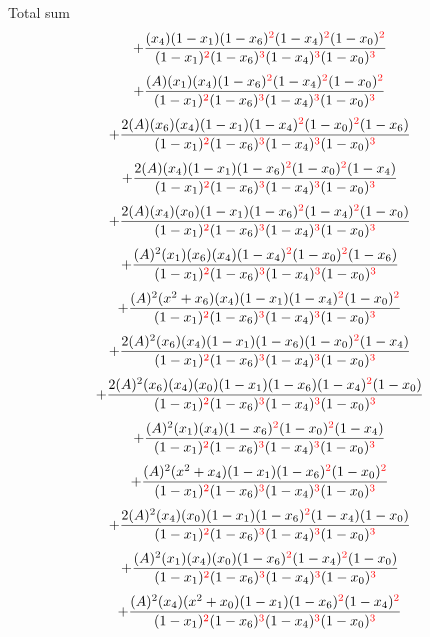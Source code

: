 \documentclass{article}
\begin{document}
Total sum
\[+\frac{(x_4)(1-x_1)(1-x_6)^{\textcolor{red}{2}}(1-x_4)^{\textcolor{red}{2}}(1-x_0)^{\textcolor{red}{2}}}{(1-x_1)^{\textcolor{red}{2}}(1-x_6)^{\textcolor{red}{3}}(1-x_4)^{\textcolor{red}{3}}(1-x_0)^{\textcolor{red}{3}}}\]\[+\frac{(A)(x_1)(x_4)(1-x_6)^{\textcolor{red}{2}}(1-x_4)^{\textcolor{red}{2}}(1-x_0)^{\textcolor{red}{2}}}{(1-x_1)^{\textcolor{red}{2}}(1-x_6)^{\textcolor{red}{3}}(1-x_4)^{\textcolor{red}{3}}(1-x_0)^{\textcolor{red}{3}}}\]\[+\frac{2(A)(x_6)(x_4)(1-x_1)(1-x_4)^{\textcolor{red}{2}}(1-x_0)^{\textcolor{red}{2}}(1-x_6)}{(1-x_1)^{\textcolor{red}{2}}(1-x_6)^{\textcolor{red}{3}}(1-x_4)^{\textcolor{red}{3}}(1-x_0)^{\textcolor{red}{3}}}\]\[+\frac{2(A)(x_4)(1-x_1)(1-x_6)^{\textcolor{red}{2}}(1-x_0)^{\textcolor{red}{2}}(1-x_4)}{(1-x_1)^{\textcolor{red}{2}}(1-x_6)^{\textcolor{red}{3}}(1-x_4)^{\textcolor{red}{3}}(1-x_0)^{\textcolor{red}{3}}}\]\[+\frac{2(A)(x_4)(x_0)(1-x_1)(1-x_6)^{\textcolor{red}{2}}(1-x_4)^{\textcolor{red}{2}}(1-x_0)}{(1-x_1)^{\textcolor{red}{2}}(1-x_6)^{\textcolor{red}{3}}(1-x_4)^{\textcolor{red}{3}}(1-x_0)^{\textcolor{red}{3}}}\]\[+\frac{(A)^{2}(x_1)(x_6)(x_4)(1-x_4)^{\textcolor{red}{2}}(1-x_0)^{\textcolor{red}{2}}(1-x_6)}{(1-x_1)^{\textcolor{red}{2}}(1-x_6)^{\textcolor{red}{3}}(1-x_4)^{\textcolor{red}{3}}(1-x_0)^{\textcolor{red}{3}}}\]\[+\frac{(A)^{2}(x^{2}+x_6)(x_4)(1-x_1)(1-x_4)^{\textcolor{red}{2}}(1-x_0)^{\textcolor{red}{2}}}{(1-x_1)^{\textcolor{red}{2}}(1-x_6)^{\textcolor{red}{3}}(1-x_4)^{\textcolor{red}{3}}(1-x_0)^{\textcolor{red}{3}}}\]\[+\frac{2(A)^{2}(x_6)(x_4)(1-x_1)(1-x_6)(1-x_0)^{\textcolor{red}{2}}(1-x_4)}{(1-x_1)^{\textcolor{red}{2}}(1-x_6)^{\textcolor{red}{3}}(1-x_4)^{\textcolor{red}{3}}(1-x_0)^{\textcolor{red}{3}}}\]\[+\frac{2(A)^{2}(x_6)(x_4)(x_0)(1-x_1)(1-x_6)(1-x_4)^{\textcolor{red}{2}}(1-x_0)}{(1-x_1)^{\textcolor{red}{2}}(1-x_6)^{\textcolor{red}{3}}(1-x_4)^{\textcolor{red}{3}}(1-x_0)^{\textcolor{red}{3}}}\]\[+\frac{(A)^{2}(x_1)(x_4)(1-x_6)^{\textcolor{red}{2}}(1-x_0)^{\textcolor{red}{2}}(1-x_4)}{(1-x_1)^{\textcolor{red}{2}}(1-x_6)^{\textcolor{red}{3}}(1-x_4)^{\textcolor{red}{3}}(1-x_0)^{\textcolor{red}{3}}}\]\[+\frac{(A)^{2}(x^{2}+x_4)(1-x_1)(1-x_6)^{\textcolor{red}{2}}(1-x_0)^{\textcolor{red}{2}}}{(1-x_1)^{\textcolor{red}{2}}(1-x_6)^{\textcolor{red}{3}}(1-x_4)^{\textcolor{red}{3}}(1-x_0)^{\textcolor{red}{3}}}\]\[+\frac{2(A)^{2}(x_4)(x_0)(1-x_1)(1-x_6)^{\textcolor{red}{2}}(1-x_4)(1-x_0)}{(1-x_1)^{\textcolor{red}{2}}(1-x_6)^{\textcolor{red}{3}}(1-x_4)^{\textcolor{red}{3}}(1-x_0)^{\textcolor{red}{3}}}\]\[+\frac{(A)^{2}(x_1)(x_4)(x_0)(1-x_6)^{\textcolor{red}{2}}(1-x_4)^{\textcolor{red}{2}}(1-x_0)}{(1-x_1)^{\textcolor{red}{2}}(1-x_6)^{\textcolor{red}{3}}(1-x_4)^{\textcolor{red}{3}}(1-x_0)^{\textcolor{red}{3}}}\]\[+\frac{(A)^{2}(x_4)(x^{2}+x_0)(1-x_1)(1-x_6)^{\textcolor{red}{2}}(1-x_4)^{\textcolor{red}{2}}}{(1-x_1)^{\textcolor{red}{2}}(1-x_6)^{\textcolor{red}{3}}(1-x_4)^{\textcolor{red}{3}}(1-x_0)^{\textcolor{red}{3}}}\]
\end{document}
